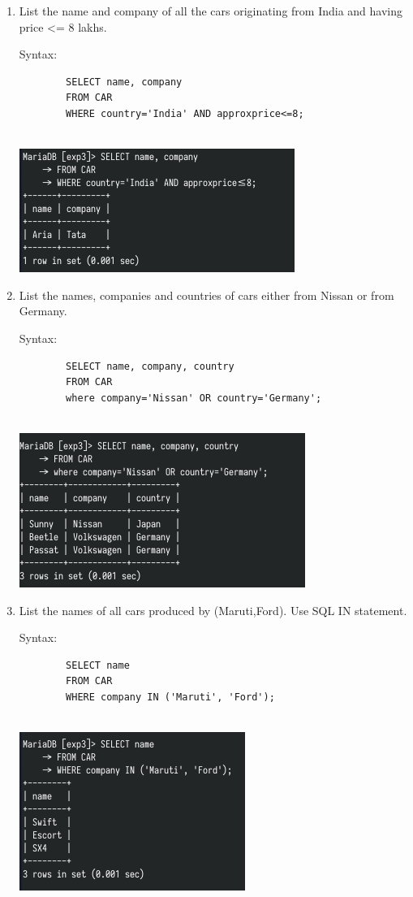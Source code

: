 \documentclass[13pt,oneside]{book}
\begin{document}
\begin{enumerate}
		
		\item
		List the name and company of all the cars originating from India and
		 having price <= 8 lakhs.
		 
		Syntax:
		\begin{verbatim}
		SELECT name, company
		FROM CAR
		WHERE country='India' AND approxprice<=8;
		
		\end{verbatim}
		\includegraphics[]{img/p3/ss5.png}
		
		
		\item
		List the names, companies and countries of cars either from Nissan or
		 from Germany.
		 
		Syntax:
		\begin{verbatim}
		SELECT name, company, country
		FROM CAR
		where company='Nissan' OR country='Germany';
		
		\end{verbatim}
		\includegraphics[]{img/p3/ss6.png}
		
		
		\item
		List the names of all cars produced by (Maruti,Ford). Use SQL IN
		 statement.
		 
		Syntax:
		\begin{verbatim}
		SELECT name
		FROM CAR
		WHERE company IN ('Maruti', 'Ford');
		
		\end{verbatim}
		\includegraphics[]{img/p3/ss7.png}
		

\end{enumerate}
\end{document}
